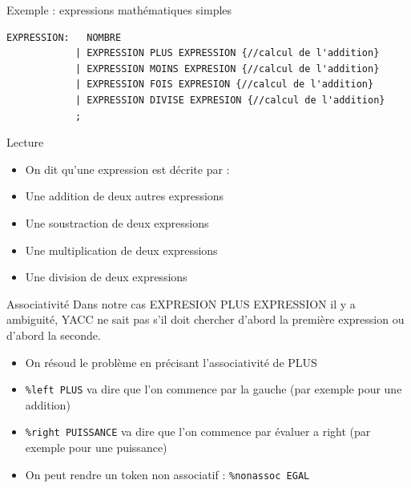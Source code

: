 
\begin{frame}[containsverbatim]{\ftitle}
\def\blocktitle{Exemple : expressions mathématiques simples}
\begin{block}{\blocktitle}
\begin{verbatim}
EXPRESSION:   NOMBRE
			| EXPRESSION PLUS EXPRESSION {//calcul de l'addition}
			| EXPRESSION MOINS EXPRESION {//calcul de l'addition}
			| EXPRESSION FOIS EXPRESION {//calcul de l'addition}
			| EXPRESSION DIVISE EXPRESION {//calcul de l'addition}
			;
\end{verbatim}
\end{block}

\def\blocktitle{Lecture}
\begin{block}{\blocktitle}
\begin{itemize}
\item On dit qu'une expression est décrite par :
\item Une addition de deux autres expressions
\item Une soustraction de deux expressions
\item Une multiplication de deux expressions
\item Une division de deux expressions
\end{itemize}
\end{block}
\end{frame}




\begin{frame}[containsverbatim]{\ftitle}
\def\blocktitle{Associativité}
\begin{block}{\blocktitle}
Dans notre cas EXPRESION PLUS EXPRESSION il y a ambiguité, YACC ne sait pas s'il doit chercher d'abord la première expression ou d'abord la seconde.
\begin{itemize}
\item On résoud le problème en précisant l'associativité de PLUS
\item \verb!%left PLUS! va dire que l'on commence par la gauche (par exemple pour une addition)
\item \verb!%right PUISSANCE! va dire que l'on commence par évaluer a right (par exemple pour une puissance)
\item On peut rendre un token non associatif : \verb!%nonassoc EGAL!
\end{itemize}
\end{block}

\end{frame}


